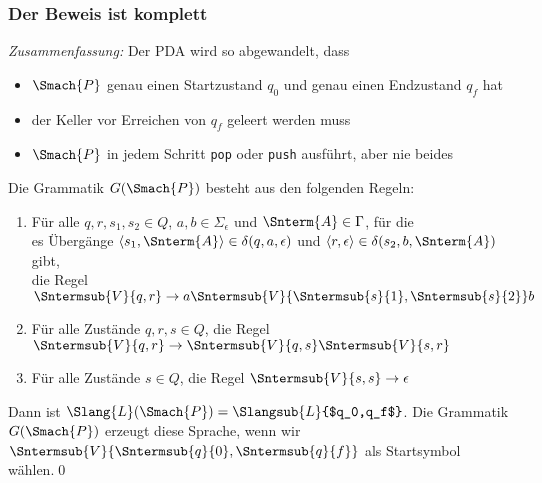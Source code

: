\documentclass[aspectratio=1610,onlymath]{beamer}
\begin{document}
\begin{frame}\frametitle{Der Beweis ist komplett}

\emph{Zusammenfassung:} Der \alert{PDA } wird so abgewandelt, dass
\begin{itemize}
\item $\Smach{P}$ genau einen Startzustand $q_0$ und genau einen Endzustand $q_f$ hat
\item der Keller vor Erreichen von $q_f$ geleert werden muss
\item $\Smach{P}$ in jedem Schritt \texttt{pop} oder \texttt{push} ausführt, aber nie beides
\end{itemize}\medskip

Die \alert{Grammatik $G(\Smach{P})$} besteht aus den folgenden Regeln:

\begin{enumerate}[(1)]
\item Für alle $q,r,s_1,s_2\in Q$, $a,b\in\Sigma_\epsilon$
und $\Snterm{A}\in\Gamma$, für die\\es Übergänge
$\tuple{s_1,\Snterm{A}}\in\delta(q,a,\epsilon)$ und $\tuple{r,\epsilon}\in\delta(s_2,b,\Snterm{A})$ gibt,\\
die Regel $\Sntermsub{V}{q,r} \to a\Sntermsub{V}{{\Sntermsub{s}{1}},{\Sntermsub{s}{2}}}b$
% 
\item Für alle Zustände $q,r,s\in Q$, die Regel $\Sntermsub{V}{q,r} \to \Sntermsub{V}{q,s}\Sntermsub{V}{s,r}$
% 
\item Für alle Zustände $s\in Q$, die Regel $\Sntermsub{V}{s,s} \to \epsilon$
\end{enumerate}

Dann ist $\Slang{L}(\Smach{P})=\Slangsub{L}{$q_0,q_f$}$. Die Grammatik $G(\Smach{P})$ erzeugt diese Sprache,
wenn wir $\Sntermsub{V}{\Sntermsub{q}{0},{\Sntermsub{q}{f}}}$ als Startsymbol wählen.\qed

\end{frame}
\end{document}
